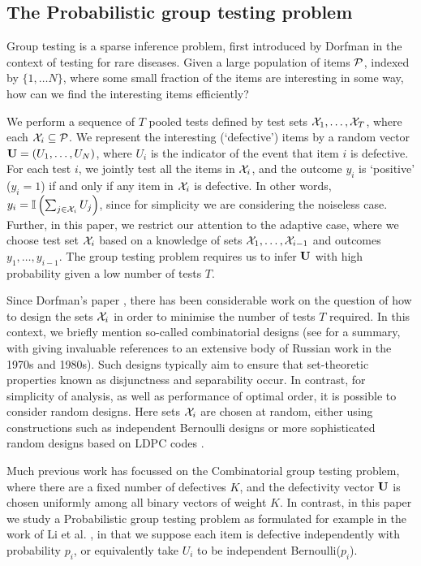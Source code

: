 \subsection{The Probabilistic group testing problem}
Group testing is a sparse inference problem, first introduced by Dorfman \cite{dorfman} in the context of testing for rare diseases.
Given  a large population of items \({\mathcal{P}}\),
indexed by \( \{1, \ldots N\}\), where
some small fraction of the items are interesting in some way, how can we find the interesting items efficiently? 

We perform a sequence of $T$ pooled tests defined by test sets ${\mathcal{X}}_1, \ldots, {\mathcal{X}}_T$, where each ${\mathcal{X}}_i \subseteq {\mathcal{P}}$. 
We represent the interesting (`defective') items by 
a random vector ${\mathbf{ U}} = ( U_1, \ldots, U_N)$, where $U_i$ is the indicator of the event that item $i$ is defective. 
For each test $i$, we jointly 
test all the items in ${\mathcal{X}}_i$, and the outcome $y_i$ is `positive' ($y_i = 1$) if and only if any item in ${\mathcal{X}}_i$ is defective. In other words, 
$y_i = {\mathbb{I}} \left( \sum_{j \in {\mathcal{X}}_i} U_j \right)$, since for simplicity we are  considering the noiseless case. Further, in this paper, we restrict our attention to
 the adaptive case, where we choose test set
${\mathcal{X}}_i$ based on a knowledge of sets ${\mathcal{X}}_1, \ldots, {\mathcal{X}}_{i-1}$ and outcomes $y_1, \ldots, y_{i-1}$. The group testing problem requires us to infer ${\mathbf{ U}}$ with high
probability given a low number of tests $T$.

Since Dorfman's paper \cite{dorfman}, there has been considerable work on the question of how to design the sets ${\mathcal{X}}_i$ in order to minimise the number of tests $T$
required. In this context, we briefly mention so-called combinatorial designs (see \cite{du, malyutov} for a summary, with \cite{malyutov} giving invaluable
references to an extensive body of Russian work in the 1970s and 1980s). Such designs typically aim to ensure that 
set-theoretic properties known as disjunctness
and separability occur. In contrast, for simplicity of analysis, as well as  performance of optimal order, it is possible to consider random designs. Here sets ${\mathcal{X}}_i$ are chosen
at random, either using constructions such as independent Bernoulli designs \cite{atia, johnsonc8, johnson33} or more sophisticated  random designs based on LDPC codes \cite{wadayama}. 

Much previous work has focussed on the Combinatorial group testing problem, where there are a fixed number of defectives $K$, and the defectivity vector ${\mathbf{ U}}$ is chosen uniformly among all
binary vectors of weight $K$. In contrast, in this paper we study a Probabilistic group testing problem as formulated
for example in the work of Li et al. \cite{li5}, in that we suppose 
 each item is defective  independently with probability \(p_i\), or equivalently take $U_i$ to be independent Bernoulli($p_i$).

